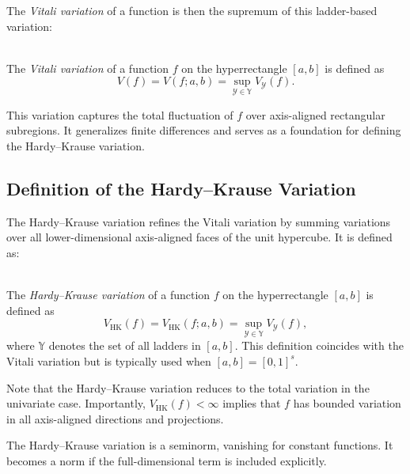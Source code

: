 The \emph{Vitali variation} of a function is then the supremum of this ladder-based variation:

\begin{definition} \ \\
    The \emph{Vitali variation} of a function $f$ on the hyperrectangle $[a,b]$ is defined as
    \begin{equation*}
        V(f) = V(f; a, b) = \sup_{\mathcal{Y} \in \mathbb{Y}} V_\mathcal{Y}(f).
    \end{equation*}
\end{definition}

This variation captures the total fluctuation of $f$ over axis-aligned
rectangular subregions. It generalizes finite differences and serves as a
foundation for defining the Hardy--Krause variation.

\subsection{Definition of the Hardy--Krause Variation}
\label{sec:hk-variation}

The Hardy--Krause variation refines the Vitali variation by summing variations
over all lower-dimensional axis-aligned faces of the unit hypercube. It is
defined as:

\begin{definition} \ \\
    The \emph{Hardy--Krause variation} of a function $f$ on the hyperrectangle
    $[a,b]$ is defined as
    \begin{equation*}
        V_{\mathrm{HK}}(f) = V_{\mathrm{HK}}(f; a, b) = \sup_{\mathcal{Y} \in \mathbb{Y}} V_\mathcal{Y}(f),
    \end{equation*}
    where $\mathbb{Y}$ denotes the set of all ladders in $[a,b]$. This definition coincides with the Vitali variation but is typically used when $[a,b] = [0,1]^s$.
\end{definition}

Note that the Hardy--Krause variation reduces to the total variation in the univariate case. Importantly, $V_{\mathrm{HK}}(f) < \infty$ implies that $f$ has bounded variation in all axis-aligned directions and projections.

\begin{remark}
The Hardy--Krause variation is a seminorm, vanishing for constant functions. It becomes a norm if the full-dimensional term is included explicitly.
\end{remark}

